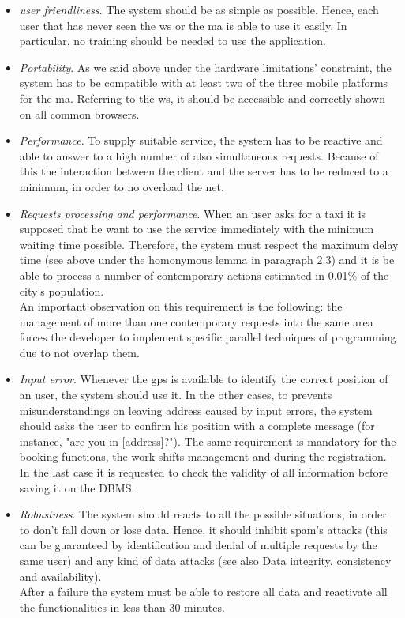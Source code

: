 \begin{itemize}
	\item \textit{\Gls{user} friendliness}. The system should be as simple as possible. Hence, each \gls{user} that has never seen the \gls{ws} or the \gls{ma} is able to use it easily. In particular, no training should be needed to use the application.

	\item \textit{Portability}. As we said above under the hardware limitations' constraint, the system has to be compatible with at least two of the three mobile platforms for the \gls{ma}. Referring to the \gls{ws}, it should be accessible and correctly shown on all common browsers.

	\item \textit{Performance}. To supply suitable service, the system has to be reactive and able to answer to a high number of also simultaneous requests. Because of this the interaction between the client and the server has to be reduced to a minimum, in order to no overload the net.
	
	\item \textit{Requests processing and performance}. When an \gls{user} asks for a taxi it is supposed that he want to use the service immediately with the minimum waiting time possible. Therefore, the system must respect the maximum delay time (see above under the homonymous lemma in paragraph 2.3) and it is be able to process a number of contemporary actions estimated in 0.01\% of the city's population.\\
An important observation on this requirement is the following: the management of more than one contemporary requests into the same area forces the developer to implement specific parallel techniques of programming due to not overlap them.

	\item \textit{Input error}. Whenever the \gls{gps} is available to identify the correct position of an \gls{user}, the system should use it. In the other cases, to prevents misunderstandings on leaving address caused by input errors, the system should asks the \gls{user} to confirm his position with a complete message (for instance, "are you in [address]?"). The same requirement is mandatory for the booking functions, the work shifts management and during the registration. In the last case it is requested to check the validity of all information before saving it on the DBMS.

	\item \textit{Robustness}. The system should reacts to all the possible situations, in order to don't fall down or lose data. Hence, it should inhibit spam's attacks (this can be guaranteed by identification and denial of multiple requests by the same \gls{user}) and any kind of data attacks (see also Data integrity, consistency and availability).\\
After a failure the system must be able to restore all data and reactivate all the functionalities in less than 30 minutes.


\end{itemize}
